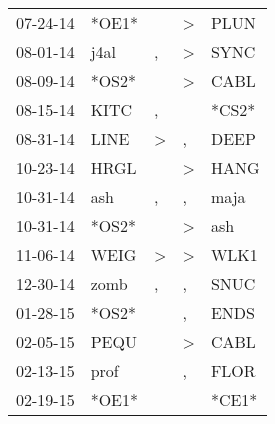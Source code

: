 \begin{supertabular}{p{0.07\textwidth}p{0.06\textwidth}p{0.02\textwidth}p{0.02\textwidth}p{0.06\textwidth}}
          07-24-14\textsuperscript{} &                            *OE1* &                  &     \textgreater &           PLUN\textsuperscript{} \\
          08-01-14\textsuperscript{} &           j4al\textsuperscript{} &                , &     \textgreater &           SYNC\textsuperscript{} \\
          08-09-14\textsuperscript{} &                            *OS2* &                  &     \textgreater &           CABL\textsuperscript{} \\
          08-15-14\textsuperscript{} &           KITC\textsuperscript{} &                , &                  &                            *CS2* \\
          08-31-14\textsuperscript{} &           LINE\textsuperscript{} &     \textgreater &                , &           DEEP\textsuperscript{} \\
          10-23-14\textsuperscript{} &           HRGL\textsuperscript{} &                  &     \textgreater &           HANG\textsuperscript{} \\
          10-31-14\textsuperscript{} &            ash\textsuperscript{} &                , &                , &           maja\textsuperscript{} \\
          10-31-14\textsuperscript{} &                            *OS2* &                  &     \textgreater &            ash\textsuperscript{} \\
          11-06-14\textsuperscript{} &           WEIG\textsuperscript{} &     \textgreater &     \textgreater &           WLK1\textsuperscript{} \\
          12-30-14\textsuperscript{} &           zomb\textsuperscript{} &                , &                , &           SNUC\textsuperscript{} \\
          01-28-15\textsuperscript{} &                            *OS2* &                  &                , &           ENDS\textsuperscript{} \\
          02-05-15\textsuperscript{} &           PEQU\textsuperscript{} &                  &     \textgreater &           CABL\textsuperscript{} \\
          02-13-15\textsuperscript{} &           prof\textsuperscript{} &                  &                , &           FLOR\textsuperscript{} \\
          02-19-15\textsuperscript{} &                            *OE1* &                  &                  &                            *CE1* \\

\end{supertabular}
